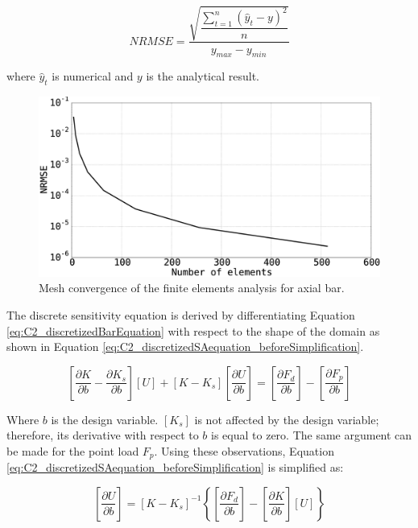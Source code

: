 \begin{equation}\label{eq:C2_NRMSE_beam}
    NRMSE = \dfrac{\sqrt{\dfrac{\sum_{t=1}^n \left( \hat{y}_t - y \right)^2}{n}}}{y_{max} - y_{min}}
\end{equation}

where $\hat{y}_t$ is numerical and $y$ is the analytical result.

\begin{figure}[h]
    \centering
    \includegraphics[width=14.00cm]{Chapter_2/figure/axial_bar_governing_equation_mesh_convergence.eps}
    \caption{Mesh convergence of the finite elements analysis for axial bar.}
    \label{fig:C2_axialBarSolution}
\end{figure}

The discrete sensitivity equation is derived by differentiating Equation \eqref{eq:C2_discretizedBarEquation} with respect to the shape of the domain as shown in Equation \eqref{eq:C2_discretizedSAequation_beforeSimplification}.

\begin{equation}\label{eq:C2_discretizedSAequation_beforeSimplification}
    \left[ \frac{\partial K}{\partial b} - \frac{\partial K_s}{\partial b} \right] [U] + 
    [K - K_s] \left[ \frac{\partial U}{\partial b} \right] = 
    \left[ \frac{\partial F_d}{\partial b} \right] - 
    \left[ \frac{\partial F_p}{\partial b} \right]
\end{equation}

Where $b$ is the design variable. $[K_s]$ is not affected by the design variable; therefore, its derivative with respect to $b$ is equal to zero. The same argument can be made for the point load $F_p$. Using these observations, Equation \eqref{eq:C2_discretizedSAequation_beforeSimplification} is simplified as:

\begin{equation}\label{eq:C2_discretizedSensitivityEquation}
    \left[ \frac{\partial U}{\partial b} \right] = 
    [K - K_s]^{-1}
    \left\{
    \left[ \frac{\partial F_d}{\partial b} \right] - \left[ \frac{\partial K}{\partial b} \right] [U]
    \right\}
\end{equation}

